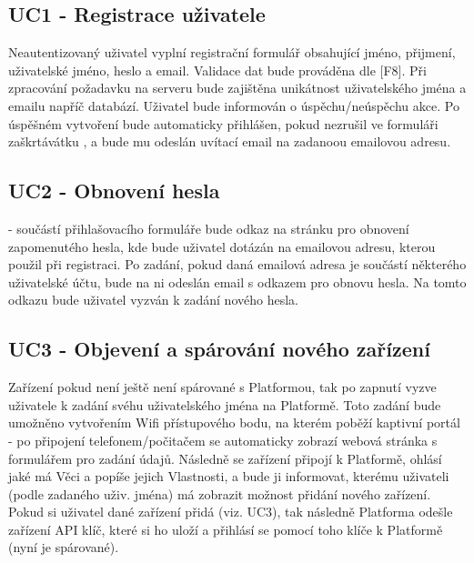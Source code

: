 \subsection{UC1 - Registrace uživatele}
Neautentizovaný uživatel vyplní registrační formulář obsahující jméno, přijmení, uživatelské jméno, heslo a email. Validace dat bude prováděna dle [F8]. Při zpracování požadavku na serveru bude zajištěna unikátnost uživatelského jména a emailu napříč databází. Uživatel bude informován o úspěchu/neúspěchu akce. Po úspěšném vytvoření bude automaticky přihlášen, pokud nezrušil ve formuláři zaškrtávátku , a bude mu odeslán uvítací email na zadanoou emailovou adresu.

\subsection{UC2 - Obnovení hesla}
- součástí přihlašovacího formuláře bude odkaz na stránku pro obnovení zapomenutého hesla, kde bude uživatel dotázán na emailovou adresu, kterou použil při registraci. Po zadání, pokud daná emailová adresa je součástí některého uživatelské účtu, bude na ni odeslán email s odkazem pro obnovu hesla. Na tomto odkazu bude uživatel vyzván k zadání nového hesla.

\subsection{UC3 - Objevení a spárování nového zařízení}
Zařízení pokud není ještě není spárované s Platformou, tak po zapnutí vyzve uživatele k zadání svéhu uživatelského jména na Platformě. Toto zadání bude umožněno vytvořením Wifi přístupového bodu, na kterém poběží kaptivní portál - po připojení telefonem/počitačem se automaticky zobrazí webová stránka s formulářem pro zadání údajů. Následně se zařízení připojí k Platformě, ohlásí jaké má Věci a popíše jejich Vlastnosti, a bude ji informovat, kterému uživateli (podle zadaného uživ. jména) má zobrazit možnost přidání nového zařízení. Pokud si uživatel dané zařízení přidá (viz. UC3), tak následně Platforma odešle zařízení API klíč, které si ho uloží a přihlásí se pomocí toho klíče k Platformě (nyní je spárované).

